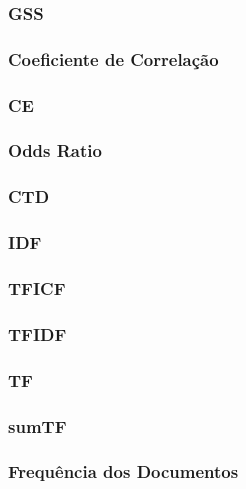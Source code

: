 \subsubsection{GSS}
\label{subsubsection::gss}

\subsubsection{Coeficiente de Correlação}
\label{subsubsection::cc}


\subsubsection{CE}
\label{subsubsection::}


\subsubsection{Odds Ratio}
\label{subsubsection::or}

\subsubsection{CTD}
\label{subsubsection::ctd}


\subsubsection{IDF}
\label{subsubsection::idf}

\subsubsection{TFICF}
\label{subsubsection::tfidf}


\subsubsection{TFIDF}
\label{subsubsection::tfidf}

\subsubsection{TF}
\label{subsubsection::tf}

\subsubsection{sumTF}
\label{subsubsection::sumtf}

\subsubsection{Frequência dos Documentos}
\label{subsubsection::df}


